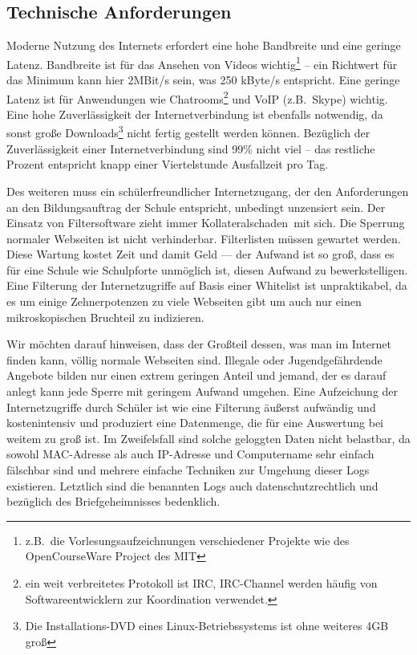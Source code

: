 \documentclass[10pt,a4paper,notitlepage]{scrartcl}
\newcommand{\gfo}{\grqq\ }
\newcommand{\gfu}{\glqq}
\begin{document}
\subsection{Technische Anforderungen}
\begin{multicols}{2}
Moderne Nutzung des Internets erfordert eine hohe Bandbreite und eine geringe Latenz. Bandbreite ist für das Ansehen von Videos wichtig\footnote{z.B.\ die Vorlesungsaufzeichnungen verschiedener Projekte wie des OpenCourseWare Project des MIT}	-- ein Richtwert für  das Minimum kann hier 2MBit/s sein, was 250 kByte/s entspricht. Eine geringe Latenz ist für Anwendungen wie Chatrooms\footnote{ein weit verbreitetes Protokoll ist IRC, IRC-Channel werden häufig von Softwareentwicklern zur Koordination verwendet.} und VoIP (z.B.\ Skype) wichtig. Eine hohe Zuverlässigkeit der Internetverbindung ist ebenfalls notwendig, da sonst große Downloads\footnote{Die Installations-DVD eines Linux-Betriebssystems ist ohne weiteres 4GB groß} nicht fertig gestellt werden können. Bezüglich der Zuverlässigkeit einer Internetverbindung sind 99\% nicht viel -- das restliche Prozent entspricht knapp einer Viertelstunde Ausfallzeit pro Tag.

Des weiteren muss ein schülerfreundlicher Internetzugang, der den Anforderungen an den Bildungsauftrag der Schule entspricht, unbedingt unzensiert sein. Der Einsatz von Filtersoftware zieht immer \gfu Kollateralschaden\gfo mit sich. Die Sperrung normaler Webseiten ist nicht verhinderbar.
Filterlisten müssen gewartet werden. Diese Wartung kostet Zeit und damit Geld --- der Aufwand ist so groß, dass es für eine Schule wie Schulpforte unmöglich ist, diesen Aufwand zu bewerkstelligen. Eine Filterung der Internetzugriffe auf Basis einer Whitelist ist unpraktikabel, da es um einige Zehnerpotenzen zu viele Webseiten gibt um auch nur einen mikroskopischen Bruchteil zu indizieren.

Wir möchten darauf hinweisen, dass der Großteil dessen, was man im Internet finden kann, völlig normale Webseiten sind. Illegale oder Jugendgefährdende Angebote bilden nur einen extrem geringen Anteil und jemand, der es darauf anlegt kann jede Sperre mit geringem Aufwand umgehen. Eine Aufzeichung der Internetzugriffe durch Schüler ist wie eine Filterung äußerst aufwändig und kostenintensiv und produziert eine Datenmenge, die für eine Auswertung bei weitem zu groß ist. Im Zweifelsfall sind solche geloggten Daten nicht belastbar, da sowohl MAC-Adresse als auch IP-Adresse und Computername sehr einfach fälschbar sind und mehrere einfache Techniken zur Umgehung dieser Logs existieren. Letztlich sind die benannten Logs auch datenschutzrechtlich und bezüglich des Briefgeheimnisses bedenklich.


\end{multicols}
\end{document}
